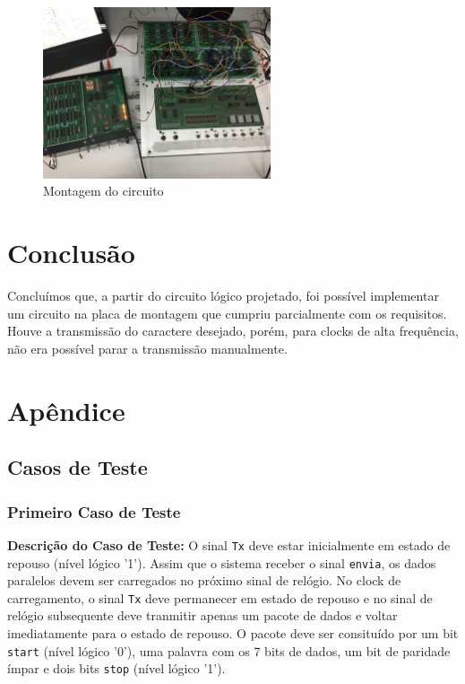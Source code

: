 \documentclass[a4,12pt]{horizon-theme}
\begin{document}
\begin{figure}[!ht]
    \centering
    \includegraphics[width=0.6\textwidth]{montagem.jpeg}
    \caption{Montagem do circuito}
    \label{fig:montagem}
\end{figure}


\section{Conclusão}
Concluímos que, a partir do circuito lógico projetado, foi possível implementar um circuito na placa de montagem que cumpriu parcialmente com os requisitos. Houve a transmissão do caractere desejado, porém, para clocks de alta frequência, não era possível parar a transmissão manualmente.




\newpage

\appendix
\section*{Apêndice}
\renewcommand{\thesubsection}{\Alph{subsection}}

\subsection{Casos de Teste}
\label{ap:tc}

\subsubsection{Primeiro Caso de Teste}
\label{ap:tc-1}
{\bf Descrição do Caso de Teste:} O sinal \texttt{Tx} deve estar inicialmente em estado de repouso (nível lógico '1'). Assim que o sistema  receber o sinal \texttt{envia}, os dados paralelos devem ser carregados no próximo sinal de relógio. No clock de carregamento, o sinal \texttt{Tx} deve permanecer em estado de repouso e no sinal de relógio subsequente deve tranmitir apenas um pacote de dados e voltar imediatamente para o estado de repouso. O pacote deve ser consituído por um bit  \texttt{start} (nível lógico '0'), uma palavra com os 7 bits de dados, um bit de paridade ímpar e dois bits \texttt{stop} (nível lógico '1').
\end{document}
